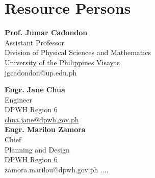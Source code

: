 %
%
%                 

\chapter{Resource Persons}
\label{sec:appendixb}

%
%
%
%

%
%

\newcommand{\resperson}[4]{\textbf{#1} \\ #2 \\ #3  \\ \url{#4}\vspace{0.5em}\\}

\resperson{Prof. Jumar Cadondon}{Assistant Professor}{Division of Physical Sciences and Mathematics} {University of the Philippines Visayas}{jgcadondon@up.edu.ph}

\resperson{Engr. Jane Chua}{Engineer}{DPWH Region 6}{chua.jane@dpwh.gov.ph}

\resperson{Engr. Marilou Zamora}{Chief}{Planning and Design}{DPWH Region 6}{zamora.marilou@dpwh.gov.ph}
....

